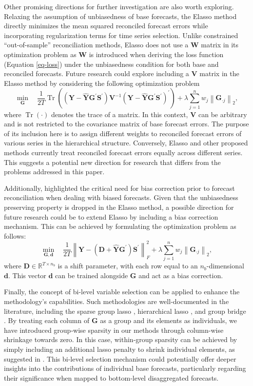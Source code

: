 \documentclass[
  11pt]{article}
\theoremstyle{plain}
\theoremstyle{remark}
\begin{document}
Other promising directions for further investigation are also worth
exploring. Relaxing the assumption of unbiasedness of base forecasts,
the Elasso method directly minimizes the mean squared reconciled
forecast errors while incorporating regularization terms for time series
selection. Unlike constrained ``out-of-sample'' reconciliation methods,
Elasso does not use a \(\bm{W}\) matrix in its optimization problem as
\(\bm{W}\) is introduced when deriving the loss function (Equation
\eqref{eq-loss}) under the unbiasedness condition for both base and
reconciled forecasts. Future research could explore including a
\(\bm{V}\) matrix in the Elasso method by considering the following
optimization problem \[
\min_{\bm{G}} \quad \frac{1}{2 T} \operatorname{Tr}\left( \left(\bm{Y}-\hat{\bm{Y}} \bm{G}^{\prime} \bm{S}^{\prime}\right)\bm{V}^{-1}\left(\bm{Y}-\hat{\bm{Y}} \bm{G}^{\prime} \bm{S}^{\prime}\right)^{\prime}\right) + \lambda \sum_{j=1}^n w_j \left\|\bm{G}_{\cdot j}\right\|_2,
\] where \(\operatorname{Tr}(\cdot)\) denotes the trace of a matrix. In
this context, \(\bm{V}\) can be arbitrary and is not restricted to the
covariance matrix of base forecast errors. The purpose of its inclusion
here is to assign different weights to reconciled forecast errors of
various series in the hierarchical structure. Conversely, Elasso and
other proposed methods currently treat reconciled forecast errors
equally across different series. This suggests a potential new direction
for research that differs from the problems addressed in this paper.

Additionally, \citet{Panagiotelis2021-mf} highlighted the critical need
for bias correction prior to forecast reconciliation when dealing with
biased forecasts. Given that the unbiasedness preserving property is
dropped in the Elasso method, a possible direction for future research
could be to extend Elasso by including a bias correction mechanism. This
can be achieved by formulating the optimization problem as follows: \[
\min_{\bm{G}, \bm{d}} \quad \frac{1}{2 T} \left\|\bm{Y}-\left(\bm{D} + \hat{\bm{Y}} \bm{G}^{\prime}\right)\bm{S}^{\prime}\right\|_F^2 + \lambda \sum_{j=1}^n w_j \left\|\bm{G}_{\cdot j}\right\|_2,
\] where \(\bm{D} \in \mathbb{R}^{T \times n_b}\) is a shift parameter,
with each row equal to an \(n_b\)-dimensional \(\bm{d}\). This vector
\(\bm{d}\) can be trained alongside \(\bm{G}\) and act as a bias
correction.

Finally, the concept of bi-level variable selection can be applied to
enhance the methodology's capabilities. Such methodologies are
well‑documented in the literature, including the sparse group lasso
\citep{Simon2013-sp}, hierarchical lasso \citep{Zhou2010-vs}, and group
bridge \citep{Huang2009-vs}. By treating each column of \(\bm{G}\) as a
group and its elements as individuals, we have introduced group‑wise
sparsity in our methods through column-wise shrinkage towards zero. In
this case, within-group sparsity can be achieved by simply including an
additional lasso penalty to shrink individual elements, as suggested in
\citet{Simon2013-sp}. This bi-level selection mechanism could
potentially offer deeper insights into the contributions of individual
base forecasts, particularly regarding their significance when mapped to
bottom‑level disaggregated forecasts.
\end{document}
